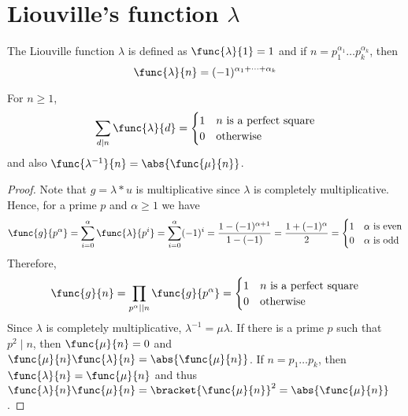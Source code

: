 \section{Liouville's function \(\lambda\)}
\begin{definition}
    The Liouville function \(\lambda\) is defined as \(\func{\lambda}{1} = 1\) and if \(n = p_1^{\alpha_1} \dots p_k^{\alpha_k}\), then 
    \begin{equation*}
        \func{\lambda}{n} = (-1)^{\alpha_1 + \dots + \alpha_k}
    \end{equation*}
\end{definition}
\begin{theorem}
    For \(n \geq 1\), 
    \begin{equation*}
        \sum_{d \mid n} \func{\lambda}{d} = \begin{cases}
            1 & n \text{ is a perfect square}\\
            0 & \text{otherwise}
        \end{cases}
    \end{equation*}
    and also \(\func{\lambda^{-1}}{n} = \abs{\func{\mu}{n}}\).
\end{theorem}
\begin{proof}
    Note that \(g = \lambda \ast u\) is multiplicative since \(\lambda\) is completely multiplicative. Hence, for a prime \(p\) and \(\alpha \geq 1\) we have 
    \begin{equation*}
        \func{g}{p^{\alpha}} = \sum_{i = 0}^{\alpha} \func{\lambda}{p^i} = \sum_{i = 0}^{\alpha} (-1)^i = \frac{1 - (-1)^{\alpha + 1}}{1 - (-1)} =  \frac{1 + (-1)^{\alpha}}{2} = \begin{cases}
            1 & \alpha \text{ is even}\\
            0 & \alpha \text{ is odd}\\
        \end{cases} 
    \end{equation*}
    Therefore, 
    \begin{equation*}
        \func{g}{n} = \prod_{p^{\alpha} \mid\mid n} \func{g}{p^{\alpha}} = \begin{cases}
            1 & n \text{ is a perfect square}\\
            0 & \text{otherwise}
        \end{cases} 
    \end{equation*}
    Since \(\lambda\) is completely multiplicative, \(\lambda^{-1} = \mu \lambda\). If there is a prime \(p\) such that \(p^2 \mid n\), then \(\func{\mu}{n} = 0\) and \(\func{\mu}{n} \func{\lambda}{n}  = \abs{\func{\mu}{n}}\). If \(n = p_1\dots p_k\), then \(\func{\lambda}{n} = \func{\mu}{n}\) and thus \(\func{\lambda}{n} \func{\mu}{n} = \bracket{\func{\mu}{n}}^2 = \abs{\func{\mu}{n}}\).
\end{proof}
